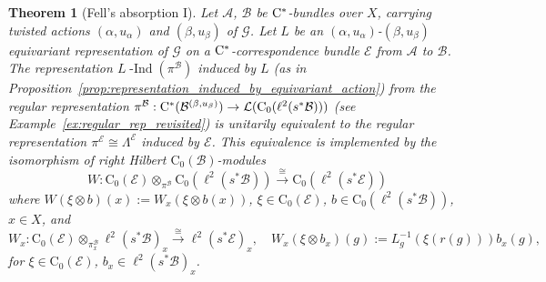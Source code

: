 \documentclass[11 pt, leqno]{amsart}
\numberwithin{equation}{section}
\theoremstyle{plain}
\newtheorem{thm}{Theorem}[section]
\theoremstyle{definition}
\newcommand*{\contz}{\mathrm{C_0}}%
\DeclareMathOperator{\dashind}{-Ind}
\newcommand{\B}{\mathcal B}
\newcommand{\LL}{\mathcal L}
\newcommand{\G}{\mathcal G} %
\newcommand{\EE}{\mathcal E}
\newcommand{\A}{\mathcal A}
\newcommand{\cst}{\ifmmode\mathrm{C}^*\else{$\mathrm{C}^*$}\fi}
\begin{document}
\begin{thm}[Fell's absorption I]\label{thm:Fell_absorption}
Let $\A$, $\B$ be $\cst$-bundles over $X$, carrying twisted actions $(\alpha,u_\alpha)$ and $(\beta,u_\beta)$ of $\G$. 
Let $L$ be an $(\alpha,u_{\alpha})$-$(\beta,u_{\beta})$ equivariant representation of $\G$ on a $\cst$-correspondence bundle $\EE$ from $\A$ to $\B$. 
The representation $L\dashind(\pi^\B)$ induced by $L$ (as in Proposition~\ref{prop:representation_induced_by_equivariant_action}) from the regular representation $\pi^\B:\cst(\B^{(\beta,u_{\beta})})\to \LL(\contz(\ell^2(s^*\B)))$ (see Example~\ref{ex:regular_rep_revisited}) is unitarily equivalent to the regular representation $\pi^{\EE}\cong\Lambda^\EE$ %
induced by $\EE$. 
This equivalence is implemented by the isomorphism of right Hilbert $\contz(\B)$-modules 
\[
    W : \contz(\EE)\otimes_{\pi^{\B}} \contz(\ell^2(s^*\B)) \stackrel{\cong}{\longrightarrow} \contz(\ell^2(s^*\EE))
\]
where $W(\xi\otimes b )(x):= W_x(\xi \otimes b(x) )$, $\xi \in \contz(\EE)$, $b\in \contz(\ell^2(s^*\B))$, $x \in X$, and 
\[
    W_x : \contz(\EE) \otimes_{\pi^{\B}_x} \ell^2(s^*\B)_x \stackrel{\cong}{\longrightarrow} \ell^2(s^*\EE)_x, \quad
    W_x \left(\xi\otimes b_x\right)(g) := L_{g}^{-1}\left(\xi(r(g))\right) b_x(g),
\]
for $\xi\in \contz(\EE)$, $b_x\in \ell^2(s^*\B)_x$. 
\end{thm}
\end{document}
